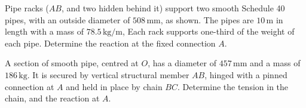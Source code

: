 \documentclass[9pt, xcolor={svgnames, x11names},professionalfonts]{beamer}
\def\scale{1}
\begin{document}
\begin{frame}{}
	\begin{myexam}{}{}
		\centering
		\def\scale{1}
		
		\parb
		Pipe racks ($AB$, and two hidden behind it) support two smooth Schedule 40 pipes, with an outside diameter of $508\,\text{mm}$, as shown. The pipes are $10\,\text{m}$ in length with a mass of $78.5\,\text{kg/m}$, Each rack supports one-third of the weight of each pipe.\parm 
		Determine the reaction at the fixed connection $A$.
		
	\end{myexam}
\end{frame}
\begin{frame}{}
	\begin{myexer}{}{}
		\centering
		\def\scale{0.65}
		
		\parb
		A section of smooth pipe, centred at $O$, has a diameter of $457\,\text{mm}$ and a mass of $186\,\text{kg}$. It is secured by vertical structural member $AB$, hinged with a pinned connection at $A$ and held in place by chain $BC$. \parm Determine the tension in the chain, and the reaction at $A$.		
		
	\end{myexer}
\end{frame}
\begin{frame}{}
	\begin{myexam}{}{}
		\centering
		\def\scale{0.5}
		
		\pars
	\end{myexam}
\end{frame}
\end{document}
